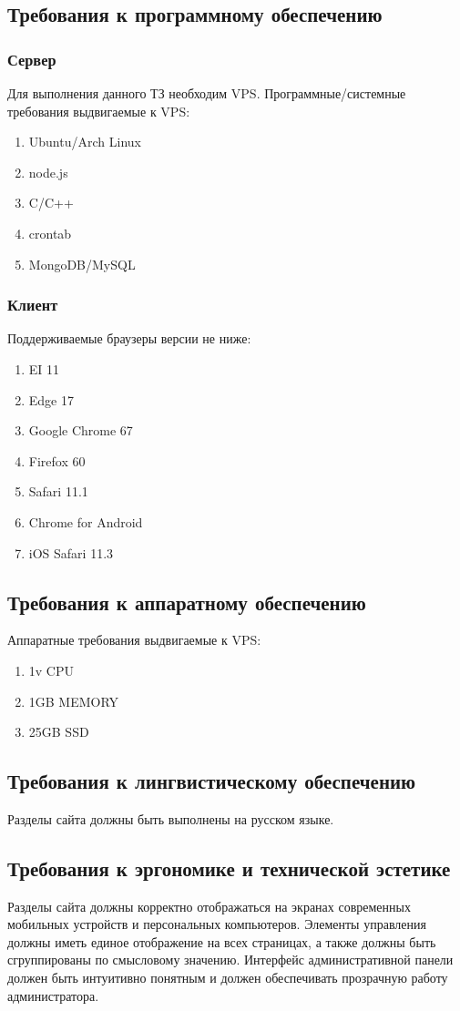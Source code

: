 \subsection{Требования к программному обеспечению}
\subsubsection{Сервер}
Для выполнения данного ТЗ необходим VPS. Программные/системные требования выдвигаемые к VPS:
\begin{enumerate}
    \item Ubuntu/Arch Linux
    \item node.js
    \item C/C++
    \item crontab
    \item MongoDB/MySQL
\end{enumerate}
\subsubsection{Клиент}
Поддерживаемые браузеры версии не ниже:
\begin{enumerate}
    \item EI 11
    \item Edge 17
    \item Google Chrome 67
    \item Firefox 60
    \item Safari 11.1
    \item Chrome for Android
    \item iOS Safari 11.3
\end{enumerate}

\subsection{Требования к аппаратному обеспечению}
Аппаратные требования выдвигаемые к VPS:
\begin{enumerate}
    \item 1v CPU
    \item 1GB MEMORY
    \item 25GB SSD
\end{enumerate}

\subsection{Требования к лингвистическому обеспечению}
Разделы сайта должны быть выполнены на русском языке.

\subsection{Требования к эргономике и технической эстетике}
Разделы сайта должны корректно отображаться на экранах современных мобильных устройств и персональных компьютеров.
Элементы управления должны иметь единое отображение на всех страницах, а также должны быть сгруппированы по смысловому значению.
Интерфейс административной панели должен быть интуитивно понятным и должен обеспечивать прозрачную работу администратора.
